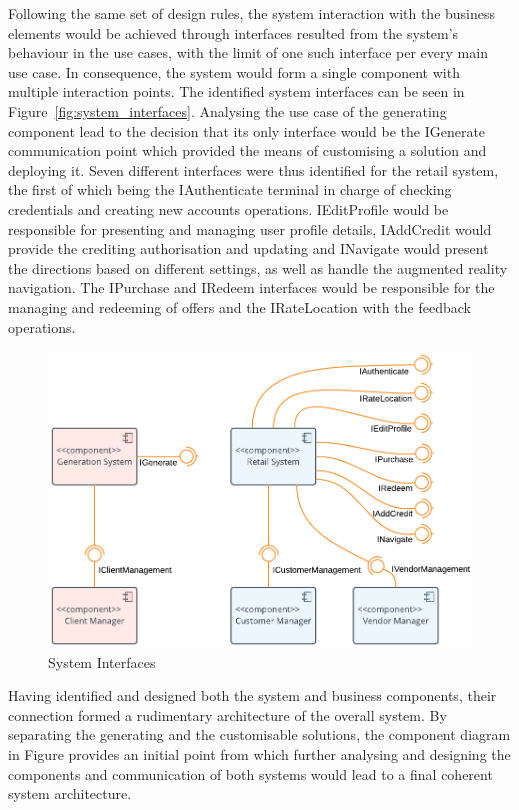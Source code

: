 Following the same set of design rules, the system interaction with the business elements would be achieved through interfaces resulted from the system's behaviour in the use cases, with the limit of one such interface per every main use case. In consequence, the system would form a single component with multiple interaction points. The identified system interfaces can be seen in Figure~\ref{fig:system_interfaces}. Analysing the use case of the generating component lead to the decision that its only interface would be the IGenerate communication point which provided the means of customising a solution and deploying it. Seven different interfaces were thus identified for the retail system, the first of which being the IAuthenticate terminal in charge of checking credentials and creating new accounts operations. IEditProfile would be responsible for presenting and managing user profile details, IAddCredit would provide the crediting authorisation and updating and INavigate would present the directions based on different settings, as well as handle the augmented reality navigation. The IPurchase and IRedeem interfaces would be responsible for the managing and redeeming of offers and the IRateLocation with the feedback operations.\\
\begin{figure}[!ht]
\centering
\includegraphics[scale=0.3]{img/Initial_Architecture.png}
\caption{System Interfaces}
\label{fig:initial_architecture}
\end{figure}

Having identified and designed both the system and business components, their connection formed a rudimentary architecture of the overall system. By separating the generating and the customisable solutions, the component diagram in Figure provides an initial point from which further analysing and designing the components and communication of both systems would lead to a final coherent system architecture.

